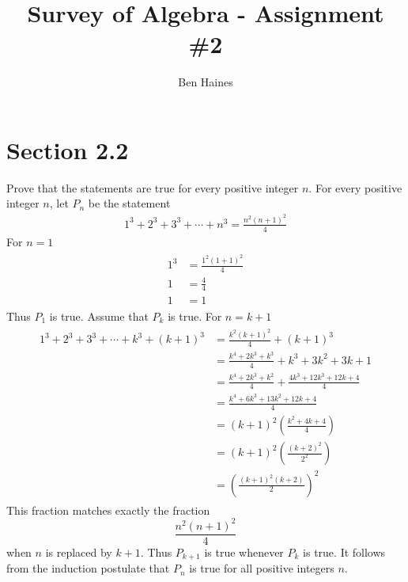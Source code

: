 \documentclass[paper=a4, fontsize=11pt]{jhwhw} %
\begin{document}
\title{Survey of Algebra - Assignment \#2}
\author{Ben Haines}

\section*{Section 2.2}
Prove that the statements are true for every positive integer $n$.
For every positive integer $n$, let $P_n$ be the statement
\begin{align}
1^3 + 2^3 + 3^3 + \cdots + n^3 = \frac{n^2\left(n+1\right)^2}{4}
\end{align}
\solution
{}
For $n=1$
\begin{align}
\begin{split}
1^3 &= \frac{1^2\left(1+1\right)^2}{4}\\
1 &= \frac{4}{4}\\
1 &= 1
\end{split}
\end{align}
Thus $P_1$ is true.
Assume that $P_k$ is true.
For $n=k+1$
\begin{align}
\begin{split}
1^3  +2^3 + 3^3 + \cdots + k^3 + \left(k+1\right)^3 &= \frac{k^2\left(k+1\right)^2}{4} + \left(k+1\right)^3\\
&=\frac{k^4 + 2k^3 + k^3}{4} + k^3 + 3k^2 + 3k +1\\
&=\frac{k^4 + 2k^3 + k^2}{4} + \frac{4k^3 + 12k^3 + 12k + 4}{4}\\
&=\frac{k^4 + 6k^3 + 13k^2 + 12k + 4}{4}\\
&=\left(k+1\right)^2\left(\frac{k^2 + 4k + 4}{4}\right)\\
&=\left(k+1\right)^2\left(\frac{\left(k+2\right)^2}{2^2}\right)\\
&=\left(\frac{\left(k+1\right)^2\left(k+2\right)}{2}\right)^2
\end{split}
\end{align}
This fraction matches exactly the fraction $$\frac{n^2\left(n+1\right)^2}{4}$$ when $n$ is replaced by $k+1$. Thus $P_{k+1}$ is true whenever $P_k$ is true. It follows from the induction postulate that $P_n$ is true for all positive integers $n$.
\end{document}
